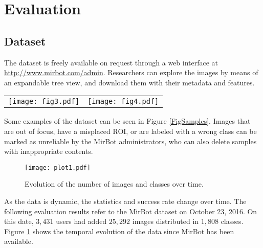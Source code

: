 \documentclass[final, twocolumn]{elsarticle}
\begin{document}
\section{Evaluation}
\label{evaluation}


\subsection{Dataset}

The dataset is freely available on request through a web interface at \url{http://www.mirbot.com/admin}. Researchers can explore the images by means of an expandable tree view, and download them with their metadata and features.

\begin{figure*}
\centering
  \begin{tabular}{@{}cc@{}}
    \texttt{[image: fig3.pdf]} &
    \texttt{[image: fig4.pdf]} \\
  \end{tabular}
  \caption{\label{FigSamples}Example of images from banana (left) and computer mouse (right) classes. The bottom-right image with a red background is marked as unreliable, as it is a smartphone.}
\end{figure*}

Some examples of the dataset can be seen in Figure \ref{FigSamples}. Images that are out of focus, have a misplaced ROI, or are labeled with a wrong class can be marked as unreliable by the MirBot administrators, who can also delete samples with inappropriate contents.

\begin{figure}
\center
\texttt{[image: plot1.pdf]}
\caption{\label{Plot1}Evolution  of the number of images and classes over time. }
\end{figure}

As the data is dynamic, the statistics and success rate change over time. The following evaluation results refer to the MirBot dataset on October 23, 2016. On this date, $3,431$ users had added  $25,292$ images distributed in $1,808$ classes. Figure \ref{Plot1} shows the temporal evolution of the data since MirBot has been available.
\end{document}
